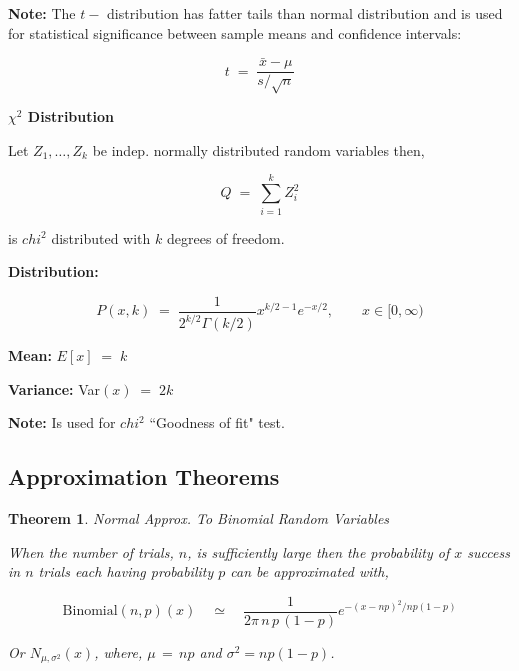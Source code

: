 \documentclass[10pt]{article}
\newtheorem{theorem}{Theorem}
\numberwithin{equation}{section}
\begin{document}
\vspace{1mm} 

\noindent
\textbf{Note:}  The $t-$ distribution has fatter tails than normal distribution and is used for statistical significance between sample means and confidence intervals:

$$ t \; = \; \frac{\bar{x} - \mu}{s/\sqrt{n}} $$


 
 
 \vspace{3mm} 

\noindent
\textbf{$\chi^2$ Distribution}

Let $Z_{1}, \ldots, Z_{k}$ be indep. normally distributed random variables then, 

\begin{equation}
Q \; = \; \sum_{i=1}^{k} Z_{i}^2
\end{equation}

\noindent
is $chi^{2}$ distributed with $k$ degrees of freedom.

\vspace{1mm}

 \noindent
 \textbf{Distribution:}  
 
 \begin{equation}
 P(x , k )   \; = \;  \frac{1}{2^{k/2} \Gamma(k/2)} x^{k/2 - 1} e^{-x/2}, \qquad x \in [0, \infty)
 \end{equation}
 
 
 \vspace{1mm} 

\noindent
\textbf{Mean:} $E[x] \; = \;  k $
 
\noindent
\textbf{Variance:}  Var$(x) \; = \;  2k $

 
 \vspace{1mm} 


\noindent
\textbf{Note:}  Is used for $chi^2$ ``Goodness of fit" test.




\subsection{Approximation Theorems}

\begin{theorem}{Normal Approx. To Binomial Random Variables}

When the number of trials, $n$, is sufficiently large then the probability of $x$ success in $n$ trials each having probability $p$ can be approximated with,

\begin{equation}
\text{Binomial}(n,p)(x) \quad \simeq \quad  \frac{1}{2 \pi \, n \, p \, (1-p)} e^{-(x-np)^{2} / np  (1-p)}
\end{equation}

\noindent
Or $N_{\mu, \sigma^{2}}(x)$, where, $\mu \, = \, np$ and $\sigma^{2} = np(1-p)$.
\end{theorem}
\end{document}
